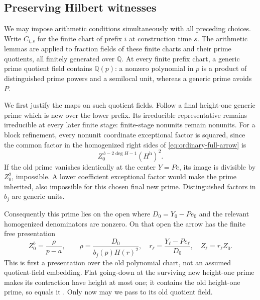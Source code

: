 \documentclass[11pt,reqno]{amsart}
\numberwithin{equation}{section}
\theoremstyle{plain}
\theoremstyle{definition}
\theoremstyle{remark}
\begin{document}
\subsection{Preserving Hilbert witnesses}

We may impose arithmetic conditions simultaneously with all
preceding choices. Write \(C_{i,s}\) for the finite chart of prefix
\(i\) at construction time \(s\). The arithmetic lemmas are
applied to fraction fields of these finite charts and their prime
quotients, all finitely generated over \(\mathbb Q\).
At every finite prefix chart, a generic prime
quotient field contains \(\mathbb Q(p)\): a nonzero polynomial
in \(p\) is a product of distinguished prime powers and a
semilocal unit, whereas a generic prime avoids \(P\).

We first justify the maps on such quotient fields. Follow a
final height-one generic prime which is new over the lower prefix.
Its irreducible representative remains irreducible at every
later finite stage: finite-stage nonunits remain nonunits.
For a block refinement, every nonunit coordinate exceptional
factor is squared, since the common factor in the
homogenized right sides of \eqref{eq:ordinary-full-arrow} is
\[
 Z_0^{\,b-2\deg H-1}(H^{\mathrm h})^2.
\]
If the old prime vanishes identically at the center \(Y=Pe\),
its image is divisible by \(Z_0^2\), impossible. A lower
coefficient exceptional factor would make the prime inherited,
also impossible for this chosen final new prime. Distinguished
factors in \(b_j\) are generic units.

Consequently this prime lies on the open where
\(D_0=Y_0-Pe_0\) and the relevant homogenized denominators
are nonzero. On that open the arrow has the finite free
presentation
\begin{equation}\label{eq:ordinary-kummer}
 Z_0^b=\frac{\rho}{p-a},\qquad
 \rho=\frac{D_0}{b_j(p)H(r)^2},\quad
 r_\ell=\frac{Y_\ell-Pe_\ell}{D_0},\quad
 Z_\ell=r_\ell Z_0.
\end{equation}
This is first a presentation over the old polynomial chart,
not an assumed quotient-field embedding. Flat going-down at
the surviving new height-one prime makes its contraction have
height at most one; it contains the old height-one prime,
so equals it \cite{AtiyahMacdonald1969}. Only now may we
pass to its old quotient field.
\end{document}
